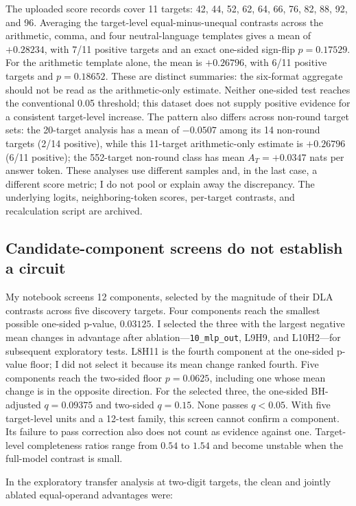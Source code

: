 \documentclass[11pt]{article}
\begin{document}
The uploaded score records cover 11 targets: 42, 44, 52, 62, 64, 66, 76, 82, 88, 92, and 96. Averaging the target-level equal-minus-unequal contrasts across the arithmetic, comma, and four neutral-language templates gives a mean of $+0.28234$, with 7/11 positive targets and an exact one-sided sign-flip $p=0.17529$. For the arithmetic template alone, the mean is $+0.26796$, with 6/11 positive targets and $p=0.18652$. These are distinct summaries: the six-format aggregate should not be read as the arithmetic-only estimate. Neither one-sided test reaches the conventional 0.05 threshold; this dataset does not supply positive evidence for a consistent target-level increase. The pattern also differs across non-round target sets: the 20-target analysis has a mean of $-0.0507$ among its 14 non-round targets (2/14 positive), while this 11-target arithmetic-only estimate is $+0.26796$ (6/11 positive); the 552-target non-round class has mean $A_T=+0.0347$ nats per answer token. These analyses use different samples and, in the last case, a different score metric; I do not pool or explain away the discrepancy. The underlying logits, neighboring-token scores, per-target contrasts, and recalculation script are archived.

\subsection{Candidate-component screens do not establish a circuit}

My notebook screens 12 components, selected by the magnitude of their DLA contrasts across five discovery targets. Four components reach the smallest possible one-sided p-value, $0.03125$. I selected the three with the largest negative mean changes in advantage after ablation—\texttt{10\_mlp\_out}, L9H9, and L10H2—for subsequent exploratory tests. L8H11 is the fourth component at the one-sided p-value floor; I did not select it because its mean change ranked fourth. Five components reach the two-sided floor $p=0.0625$, including one whose mean change is in the opposite direction. For the selected three, the one-sided BH-adjusted $q=0.09375$ and two-sided $q=0.15$. None passes $q<0.05$. With five target-level units and a 12-test family, this screen cannot confirm a component. Its failure to pass correction also does not count as evidence against one. Target-level completeness ratios range from $0.54$ to $1.54$ and become unstable when the full-model contrast is small.

In the exploratory transfer analysis at two-digit targets, the clean and jointly ablated equal-operand advantages were:
\end{document}
